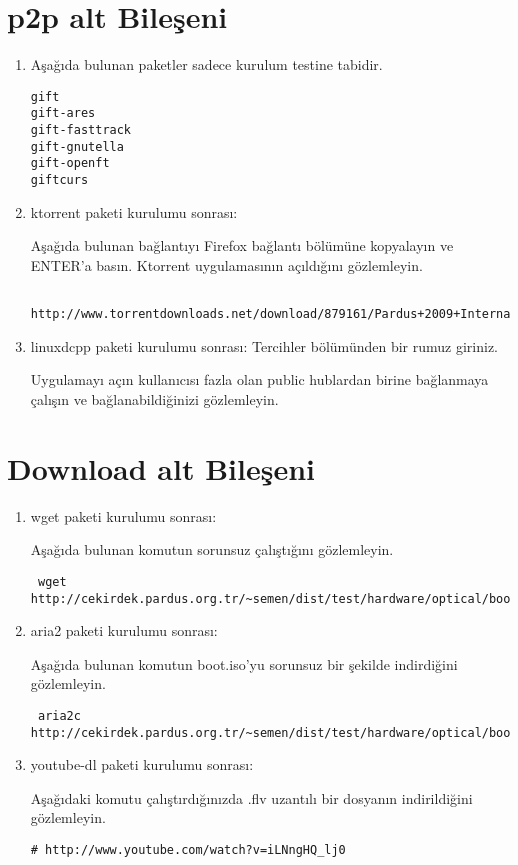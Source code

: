 \documentclass[a4paper,10pt]{article}
\begin{document}
\section{p2p alt Bileşeni}
\begin{enumerate}
 \item Aşağıda bulunan paketler sadece kurulum testine tabidir.

\begin{verbatim}
gift
gift-ares
gift-fasttrack
gift-gnutella
gift-openft
giftcurs
\end{verbatim}

\item ktorrent paketi kurulumu sonrası:

Aşağıda bulunan bağlantıyı Firefox bağlantı bölümüne kopyalayın ve ENTER'a basın. Ktorrent uygulamasının açıldığını gözlemleyin.
\begin{verbatim}
 http://www.torrentdownloads.net/download/879161/Pardus+2009+International+iso
\end{verbatim}

 \item linuxdcpp paketi kurulumu sonrası:
Tercihler bölümünden bir rumuz giriniz. 

Uygulamayı açın kullanıcısı fazla olan public hublardan birine bağlanmaya çalışın ve bağlanabildiğinizi gözlemleyin.
\end{enumerate}

\section{Download alt Bileşeni}
\begin{enumerate}
\item wget paketi kurulumu sonrası:

Aşağıda bulunan komutun sorunsuz çalıştığını gözlemleyin.
\begin{verbatim}
 wget http://cekirdek.pardus.org.tr/~semen/dist/test/hardware/optical/boot.iso
\end{verbatim}


\item aria2 paketi kurulumu sonrası:

Aşağıda bulunan komutun boot.iso'yu sorunsuz bir şekilde indirdiğini gözlemleyin.
\begin{verbatim}
 aria2c http://cekirdek.pardus.org.tr/~semen/dist/test/hardware/optical/boot.iso
\end{verbatim}

 \item youtube-dl paketi kurulumu sonrası:

Aşağıdaki komutu çalıştırdığınızda .flv uzantılı bir dosyanın indirildiğini gözlemleyin.
\begin{verbatim}
# http://www.youtube.com/watch?v=iLNngHQ_lj0
\end{verbatim}

\end{enumerate}
\end{document}
